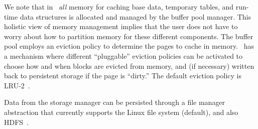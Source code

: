 We note that in \Quickstep\ \textit{all} memory for caching base data, temporary tables, and run-time data structures is allocated and managed by the buffer pool manager. This holistic view of memory management implies that the user does not have to worry about how to partition memory for these different components. The buffer pool employs an eviction policy to determine the pages to cache in memory. \Quickstep\ has a mechanism where different ``pluggable'' eviction policies can be activated to choose how and when blocks are evicted from memory, and (if necessary) written back to persistent storage if the page is ``dirty.'' The default eviction policy is LRU-2~\cite{lru-k}. %

Data from the storage manager can be persisted through a file manager abstraction that currently supports the Linux file system (default), and also HDFS~\cite{hdfs}. %





